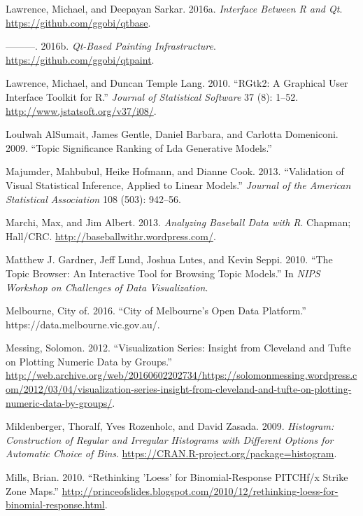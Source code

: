 \documentclass[12pt,]{isuthesis}
\begin{document}
\hypertarget{ref-qtbase}{}
Lawrence, Michael, and Deepayan Sarkar. 2016a. \emph{Interface Between R
and Qt}. \url{https://github.com/ggobi/qtbase}.

\hypertarget{ref-qtpaint}{}
---------. 2016b. \emph{Qt-Based Painting Infrastructure}.
\url{https://github.com/ggobi/qtpaint}.

\hypertarget{ref-RGtk2}{}
Lawrence, Michael, and Duncan Temple Lang. 2010. ``RGtk2: A Graphical
User Interface Toolkit for R.'' \emph{Journal of Statistical Software}
37 (8): 1--52. \url{http://www.jstatsoft.org/v37/i08/}.

\hypertarget{ref-AlSumait}{}
Loulwah AlSumait, James Gentle, Daniel Barbara, and Carlotta Domeniconi.
2009. ``Topic Significance Ranking of Lda Generative Models.''

\hypertarget{ref-Majumder:2013ie}{}
Majumder, Mahbubul, Heike Hofmann, and Dianne Cook. 2013. ``Validation
of Visual Statistical Inference, Applied to Linear Models.''
\emph{Journal of the American Statistical Association} 108 (503):
942--56.

\hypertarget{ref-baseball}{}
Marchi, Max, and Jim Albert. 2013. \emph{Analyzing Baseball Data with
R}. Chapman; Hall/CRC. \url{http://baseballwithr.wordpress.com/}.

\hypertarget{ref-Gardner}{}
Matthew J. Gardner, Jeff Lund, Joshua Lutes, and Kevin Seppi. 2010.
``The Topic Browser: An Interactive Tool for Browsing Topic Models.'' In
\emph{NIPS Workshop on Challenges of Data Visualization}.

\hypertarget{ref-melbourne}{}
Melbourne, City of. 2016. ``City of Melbourne's Open Data Platform.''
https://data.melbourne.vic.gov.au/.

\hypertarget{ref-messing}{}
Messing, Solomon. 2012. ``Visualization Series: Insight from Cleveland
and Tufte on Plotting Numeric Data by Groups.''
\url{http://web.archive.org/web/20160602202734/https://solomonmessing.wordpress.com/2012/03/04/visualization-series-insight-from-cleveland-and-tufte-on-plotting-numeric-data-by-groups/}.

\hypertarget{ref-histogram}{}
Mildenberger, Thoralf, Yves Rozenholc, and David Zasada. 2009.
\emph{Histogram: Construction of Regular and Irregular Histograms with
Different Options for Automatic Choice of Bins}.
\url{https://CRAN.R-project.org/package=histogram}.

\hypertarget{ref-loess}{}
Mills, Brian. 2010. ``Rethinking 'Loess' for Binomial-Response PITCHf/x
Strike Zone Maps.''
\url{http://princeofslides.blogspot.com/2010/12/rethinking-loess-for-binomial-response.html}.
\end{document}
